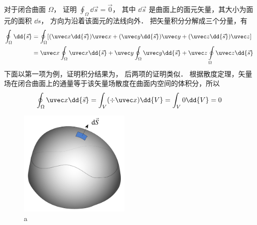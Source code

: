 
对于闭合曲面 $\Omega$，  证明 $\oint_\Omega  \dd{\vec s} = \vec 0$， 其中 $\dd{\vec s}$ 是曲面上的面元矢量，其大小为面元的面积 $\dd{s}$，  方向为沿着该面元的法线向外．
把矢量积分分解成三个分量，有
\begin{equation}
\begin{aligned}
\oint_\Omega  \dd{\vec s} & = \oint_\Omega  [(\uvec x \dd{\vec s})\uvec x + (\uvec y \dd{\vec s})\uvec y + (\uvec z \dd{\vec s})\uvec z] \\
&= \uvec x\oint_\Omega  \uvec x \dd{\vec s}  + \uvec y\oint_\Omega \uvec y \dd{\vec s} + \uvec z\oint\limits_\Omega \uvec z \dd{\vec s}
\end{aligned}
\end{equation}
下面以第一项为例，证明积分结果为， 后两项的证明类似．
根据散度定理，矢量场在闭合曲面上的通量等于该矢量场散度在曲面内空间的体积分，所以
\begin{equation}
\oint_\Omega  \uvec x \dd{\vec s}  = \int_V (\div \uvec x) \dd{V}  = \int_V 0 \dd{V}  = 0
\end{equation}
\begin{figure}[ht]
\centering
\includegraphics[width=5.34cm]{./figures/CSI0.pdf}
\caption{a} \label{CSI0_fig1}
\end{figure}

 
 

